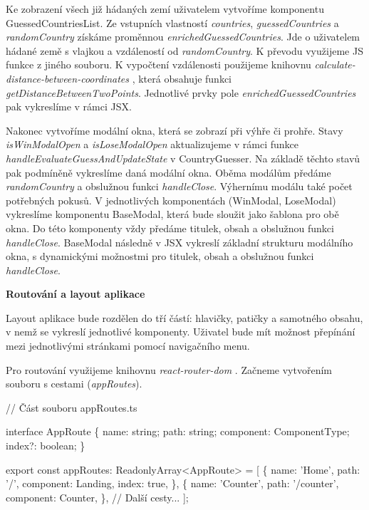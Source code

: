 Ke zobrazení všech již hádaných zemí uživatelem vytvoříme komponentu GuessedCountriesList. Ze vstupních vlastností \emph{countries}, \emph{guessedCountries} a \emph{randomCountry} získáme proměnnou \emph{enrichedGuessedCountries}. 
Jde o uživatelem hádané země s vlajkou a vzdáleností od \emph{randomCountry}. K převodu využijeme JS funkce z jiného souboru. 
K vypočtení vzdálenosti použijeme knihovnu \emph{calculate-distance-between-coordinates} \cite{distancebetweencoordinates}, která obsahuje funkci \emph{getDistanceBetweenTwoPoints}. 
Jednotlivé prvky pole \emph{enrichedGuessedCountries} pak vykreslíme v rámci JSX.

Nakonec vytvoříme modální okna, která se zobrazí při výhře či prohře. Stavy \emph{isWinModalOpen} a \emph{isLoseModalOpen} aktualizujeme v rámci funkce \emph{handleEvaluateGuessAndUpdateState} v CountryGuesser. 
Na základě těchto stavů pak podmíněně vykreslíme daná modální okna. Oběma modálům předáme \emph{randomCountry} a obslužnou funkci \emph{handleClose}. Výhernímu modálu také počet potřebných pokusů. 
V jednotlivých komponentách (WinModal, LoseModal) vykreslíme komponentu BaseModal, která bude sloužit jako šablona pro obě okna. Do této komponenty vždy předáme titulek, obsah a obslužnou funkci \emph{handleClose}. 
BaseModal následně v JSX vykreslí základní strukturu modálního okna, s dynamickými možnostmi pro titulek, obsah a obslužnou funkci \emph{handleClose}.

\begin{flushleft}
  \textbf{Routování a layout aplikace}
\end{flushleft}

Layout aplikace bude rozdělen do tří částí: hlavičky, patičky a samotného obsahu, v nemž se vykreslí jednotlivé komponenty. Uživatel bude mít možnost přepínání mezi jednotlivými stránkami pomocí navigačního menu.

Pro routování využijeme knihovnu \emph{react-router-dom} \cite{reactrouter}. Začneme vytvořením souboru s cestami (\emph{appRoutes}).

\begin{prog}
// Část souboru appRoutes.ts

interface AppRoute \{
  name: string;
  path: string;
  component: ComponentType;
  index?: boolean;
\}

export const appRoutes: ReadonlyArray<AppRoute> = [
  \{
    name: 'Home',
    path: '/',
    component: Landing,
    index: true,
  \},
  \{
    name: 'Counter',
    path: '/counter',
    component: Counter,
  \},
  // Další cesty...
];
\end{prog}

